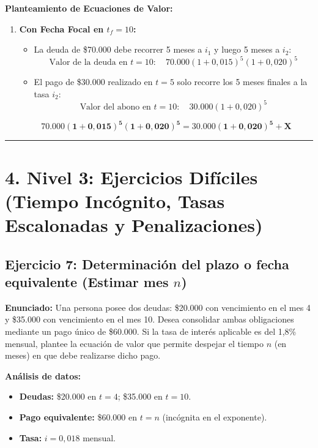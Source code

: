 \documentclass[11pt, a4paper]{article}
\begin{document}
\textbf{Planteamiento de Ecuaciones de Valor:}
\begin{enumerate}[label=\alph*)]
    \item \textbf{Con Fecha Focal en $t_f = 10$:}
    \begin{itemize}
        \item La deuda de \$70.000 debe recorrer 5 meses a $i_1$ y luego 5 meses a $i_2$:
        \[
        \text{Valor de la deuda en } t=10: \quad 70.000(1 + 0,015)^5 (1 + 0,020)^5
        \]
        \item El pago de \$30.000 realizado en $t=5$ solo recorre los 5 meses finales a la tasa $i_2$:
        \[
        \text{Valor del abono en } t=10: \quad 30.000(1 + 0,020)^5
        \]
    \end{itemize}
    \[
    \mathbf{70.000(1 + 0,015)^5 (1 + 0,020)^5 = 30.000(1 + 0,020)^5 + X}
    \]
\end{enumerate}

\vspace{0.3cm}
\hrule
\vspace{0.3cm}

\section*{\color{primary} 4. Nivel 3: Ejercicios Difíciles (Tiempo Incógnito, Tasas Escalonadas y Penalizaciones)}

\subsection*{\color{secondary} Ejercicio 7: Determinación del plazo o fecha equivalente (Estimar mes $n$)}
\textbf{Enunciado:} Una persona posee dos deudas: \$20.000 con vencimiento en el mes 4 y \$35.000 con vencimiento en el mes 10. Desea consolidar ambas obligaciones mediante un pago único de \$60.000. Si la tasa de interés aplicable es del 1,8\% mensual, plantee la ecuación de valor que permite despejar el tiempo $n$ (en meses) en que debe realizarse dicho pago.

\textbf{Análisis de datos:}
\begin{itemize}
    \item \textbf{Deudas:} \$20.000 en $t=4$; \$35.000 en $t=10$.
    \item \textbf{Pago equivalente:} \$60.000 en $t=n$ (incógnita en el exponente).
    \item \textbf{Tasa:} $i = 0,018$ mensual.
\end{itemize}
\end{document}
